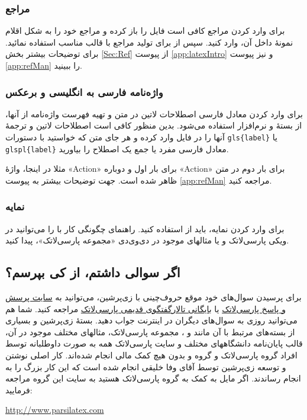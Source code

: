 \subsubsection{مراجع}
برای وارد کردن مراجع \پ کافی است فایل 
را باز کرده و مراجع خود را به شکل اقلام نمونهٔ داخل آن، وارد کنید.  سپس از  برای تولید مراجع با قالب مناسب استفاده نمائید. برای توضیحات بیشتر بخش \ref{Sec:Ref} از پیوست \ref{app:latexIntro} و نیز پیوست \ref{app:refMan} را ببینید.

\subsubsection{واژه‌نامه فارسی به انگلیسی و برعکس}
برای وارد کردن معادل فارسی اصطلاحات لاتین در متن و تهیه فهرست واژه‌نامه از آنها، از بستهٔ
و نرم‌افزار
استفاده می‌شود. بدین منظور کافی است اصطلاحات لاتین و ترجمهٔ آنها را در فایل
وارد کرده و هر جای متن که خواستید با دستورات
\verb|gls{label}|
یا \verb|glspl{label}|
معادل فارسی مفرد یا جمع یک اصطلاح را بیاورید.

مثلا در اینجا، واژهٔ
«\gls{Action}»
برای بار اول و دوباره
«\gls{Action}»
برای بار دوم در متن ظاهر شده است.
جهت توضیحات بیشتر به پیوست
\ref{app:refMan}
مراجعه کنید.
\subsubsection{نمایه}
برای وارد کردن نمایه، باید از 
استفاده کنید. 
راهنمای چگونگی کار با 
را می‌توانید در ویکی پارسی‌لاتک و یا مثالهای موجود در دی‌وی‌دی «مجموعه پارسی‌لاتک»، پیدا کنید.

\subsection{اگر سوالی داشتم، از کی بپرسم؟}
برای پرسیدن سوال‌های خود موقع حروف‌چینی با زی‌پرشین، می‌توانید به
\href{http://qa.parsilatex.com}{سایت پرسش و پاسخ پارسی‌لاتک}%
یا
\href{http://forum.parsilatex.com}{بایگانی تالارگفتگوی قدیمی پارسی‌لاتک}%
مراجعه کنید. شما هم می‌توانید روزی به سوال‌های دیگران در اینترنت جواب دهید.
بستهٔ زی‌پرشین و بسیاری از بسته‌های مرتبط با آن مانند
 و
،
مجموعه پارسی‌لاتک، مثالهای مختلف موجود در آن، قالب پایان‌نامه دانشگاههای مختلف و سایت پارسی‌لاتک همه به صورت داوطلبانه توسط افراد گروه پارسی‌لاتک و گروه
و بدون هیچ کمک مالی انجام شده‌اند. کار اصلی نوشتن و توسعه زی‌پرشین توسط آقای وفا خلیقی انجام شده است که این کار بزرگ را به انجام رساندند.
اگر مایل به کمک به گروه پارسی‌لاتک هستید به سایت این گروه مراجعه فرمایید:
\begin{center}
	\url{http://www.parsilatex.com}
\end{center}

